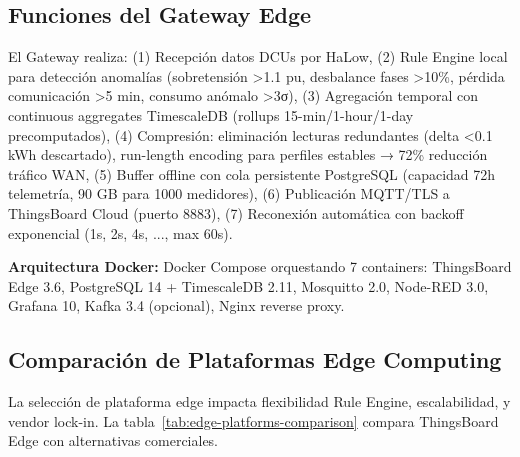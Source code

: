 \subsection{Funciones del Gateway Edge}

El Gateway realiza: (1) Recepción datos DCUs por HaLow, (2) Rule Engine local para detección anomalías (sobretensión >1.1 pu, desbalance fases >10\%, pérdida comunicación >5 min, consumo anómalo >3σ), (3) Agregación temporal con continuous aggregates TimescaleDB (rollups 15-min/1-hour/1-day precomputados), (4) Compresión: eliminación lecturas redundantes (delta <0.1 kWh descartado), run-length encoding para perfiles estables → 72\% reducción tráfico WAN, (5) Buffer offline con cola persistente PostgreSQL (capacidad 72h telemetría, 90 GB para 1000 medidores), (6) Publicación MQTT/TLS a ThingsBoard Cloud (puerto 8883), (7) Reconexión automática con backoff exponencial (1s, 2s, 4s, ..., max 60s).

\textbf{Arquitectura Docker:} Docker Compose orquestando 7 containers: ThingsBoard Edge 3.6, PostgreSQL 14 + TimescaleDB 2.11, Mosquitto 2.0, Node-RED 3.0, Grafana 10, Kafka 3.4 (opcional), Nginx reverse proxy.

\subsection{Comparación de Plataformas Edge Computing}

La selección de plataforma edge impacta flexibilidad Rule Engine, escalabilidad, y vendor lock-in. La tabla~\ref{tab:edge-platforms-comparison} compara ThingsBoard Edge con alternativas comerciales.


